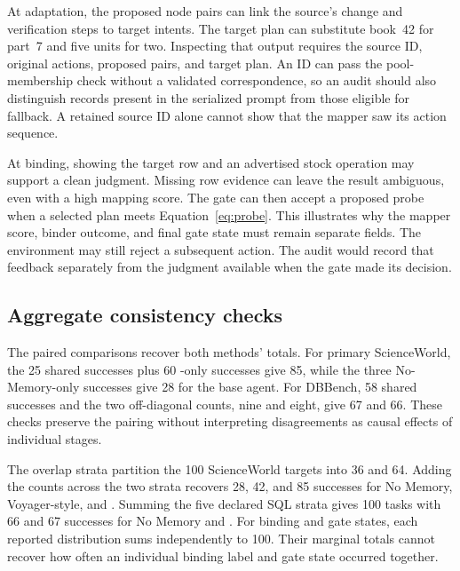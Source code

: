At adaptation, the proposed node pairs can link the source's change and verification steps to target intents. The target plan can substitute book~42 for part~7 and five units for two. Inspecting that output requires the source ID, original actions, proposed pairs, and target plan. An ID can pass the pool-membership check without a validated correspondence, so an audit should also distinguish records present in the serialized prompt from those eligible for fallback. A retained source ID alone cannot show that the mapper saw its action sequence.

At binding, showing the target row and an advertised stock operation may support a clean judgment. Missing row evidence can leave the result ambiguous, even with a high mapping score. The gate can then accept a proposed probe when a selected plan meets Equation~\ref{eq:probe}. This illustrates why the mapper score, binder outcome, and final gate state must remain separate fields. The environment may still reject a subsequent action. The audit would record that feedback separately from the judgment available when the gate made its decision.

\subsection{Aggregate consistency checks}
The paired comparisons recover both methods' totals. For primary ScienceWorld, the 25 shared successes plus 60 \SM{}-only successes give 85, while the three No-Memory-only successes give 28 for the base agent. For DBBench, 58 shared successes and the two off-diagonal counts, nine and eight, give 67 and 66. These checks preserve the pairing without interpreting disagreements as causal effects of individual stages.

The overlap strata partition the 100 ScienceWorld targets into 36 and 64. Adding the counts across the two strata recovers 28, 42, and 85 successes for No Memory, Voyager-style, and \SM{}. Summing the five declared SQL strata gives 100 tasks with 66 and 67 successes for No Memory and \SM{}. For binding and gate states, each reported distribution sums independently to 100. Their marginal totals cannot recover how often an individual binding label and gate state occurred together.
